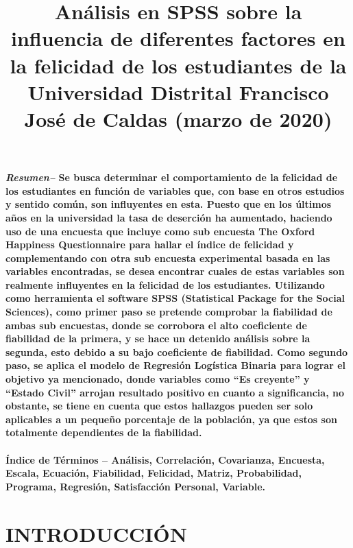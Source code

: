 \documentclass[conference]{IEEEtran}
\begin{document}
\title{Análisis en SPSS sobre la influencia de diferentes factores en la felicidad de los estudiantes de la Universidad Distrital Francisco José de Caldas
(marzo de 2020)
}

\author{
\and
{}
}

\maketitle

\textbf{\textit{Resumen--}
Se busca determinar el comportamiento de la felicidad de los estudiantes en función de variables que, con base en otros estudios y sentido común, son influyentes en esta. Puesto que en los últimos años en la universidad la tasa de deserción ha aumentado, haciendo uso de una encuesta que incluye como sub encuesta The Oxford Happiness Questionnaire para hallar el índice de felicidad y complementando con otra sub encuesta experimental basada en las variables encontradas, se desea encontrar cuales de estas variables son realmente influyentes en la felicidad de los estudiantes. Utilizando como herramienta el software SPSS (Statistical Package for the Social Sciences), como primer paso se pretende comprobar la fiabilidad de ambas sub encuestas, donde se corrobora el alto coeficiente de fiabilidad de la primera, y se hace un detenido análisis sobre la segunda, esto debido a su bajo coeficiente de fiabilidad. Como segundo paso, se aplica el modelo de Regresión Logística Binaria para lograr el objetivo ya mencionado, donde variables como “Es creyente” y “Estado Civil” arrojan resultado positivo en cuanto a significancia, no obstante, se tiene en cuenta que estos hallazgos pueden ser solo aplicables a un pequeño porcentaje de la población, ya que estos son totalmente dependientes de la fiabilidad.\\\\
Índice de Términos – Análisis, Correlación, Covarianza, Encuesta, Escala, Ecuación, Fiabilidad, Felicidad, Matriz, Probabilidad, Programa, Regresión, Satisfacción Personal, Variable.\\}

\section{INTRODUCCIÓN}\\
\end{document}
